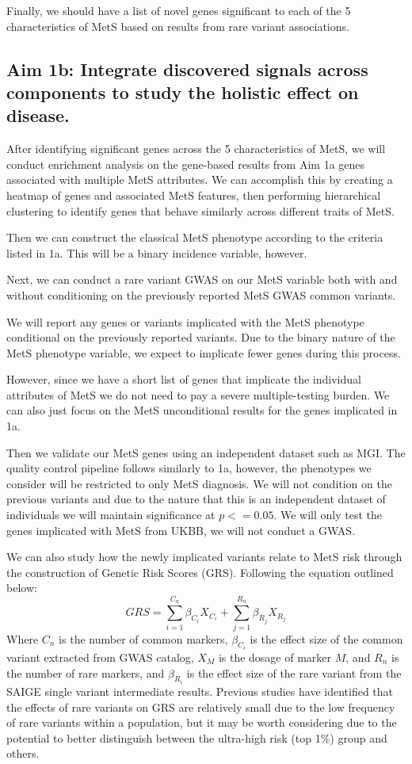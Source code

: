 \documentclass[11pt]{article}
\begin{document}
Finally, we should have a list of novel genes significant to each of the 5 characteristics of MetS based on results from rare variant associations.


\subsection*{Aim 1b: Integrate discovered signals across components to study the holistic effect on disease.} 

After identifying significant genes across the 5 characteristics of MetS, we will conduct enrichment analysis on the gene-based results from Aim 1a genes associated with multiple MetS attributes. We can accomplish this by creating a heatmap of genes and associated MetS features, then performing hierarchical clustering to identify genes that behave similarly across different traits of MetS. 

Then we can construct the classical MetS phenotype according to the criteria listed in 1a. This will be a binary incidence variable, however. 

Next, we can conduct a rare variant GWAS on our MetS variable both with and without conditioning on the previously reported MetS GWAS common variants.

We will report any genes or variants implicated with the MetS phenotype conditional on the previously reported variants. Due to the binary nature of the MetS phenotype variable, we expect to implicate fewer genes during this process.

However, since we have a short list of genes that implicate the individual attributes of MetS we do not need to pay a severe multiple-testing burden. We can also just focus on the MetS unconditional results for the genes implicated in 1a.

Then we validate our MetS genes using an independent dataset such as MGI. The quality control pipeline follows similarly to 1a, however, the phenotypes we consider will be restricted to only MetS diagnosis. We will not condition on the previous variants and due to the nature that this is an independent dataset of individuals we will maintain significance at $p <= 0.05$. We will only test the genes implicated with MetS from UKBB, we will not conduct a GWAS.

We can also study how the newly implicated variants relate to MetS risk through the construction of Genetic Risk Scores (GRS). Following the equation outlined below:
$$GRS = \sum_{i=1}^{C_n} \beta_{C_i}X_{C_i} + \sum_{j=1}^{R_n} \beta_{R_j}X_{R_j}$$
Where $C_n$ is the number of common markers, $\beta_{C_i}$ is the effect size of the common variant extracted from GWAS catalog, $X_M$ is the dosage of marker $M$, and $R_n$ is the number of rare markers, and $\beta_{R_i}$ is the effect size of the rare variant from the SAIGE single variant intermediate results. Previous studies have identified that the effects of rare variants on GRS are relatively small due to the low frequency of rare variants within a population, but it may be worth considering due to the potential to better distinguish between the ultra-high risk (top 1\%) group and others. 
\end{document}
